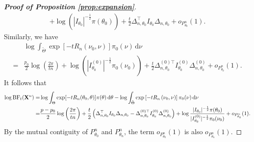 \documentclass[11pt]{article}
\theoremstyle{plain}
\theoremstyle{definition}
\theoremstyle{remark}
\begin{document}
\begin{appendices}
\begin{proof}[\textbf{Proof of Proposition \ref{prop:expansion}}]
$$\begin{aligned}
        +
        \log 
        \left( 
        |I_{\theta_0}|^{-\frac{1}{2}} \pi(\theta_0)
        \right)
     +
    \frac{t}{2}\Delta_{n,\theta_0}^\top  I_{\theta_0}\Delta_{n,\theta_0}
    +o_{P^n_{\theta_0}}(1).
\end{aligned}
$$
Similarly, we have
\begin{equation*}
\begin{split}
    &\log \int_{\tilde \Theta}
    \exp\left[-t R_n\left(\nu_0, \nu \right)\right] \pi_0(\nu)
\, \mathrm d \nu
\\
    =&
\frac{p_0}{2}\log\left(\frac{2\pi}{tn}\right) + \log \left( |I_{\theta_0}^{(0)}|^{-\frac{1}{2}} \pi_0(\nu_0)\right)
             +
             \frac{t}{2}\Delta_{n,\theta_0}^{{(0)}\top} I^{(0)}_{\theta_0}\Delta^{(0)}_{n,\theta_0}
            +o_{P^n_{\theta_0}}(1).
\end{split}
\end{equation*}
It follows that
\begin{align*}
    \log \text{BF}_t (\mathbf{X}^{n})
    =&
    \log
    \int_{\Theta}
\exp[-t R_n(\theta_0, \theta)] \pi(\theta)
\, \mathrm d \theta
-
    \log \int_{\tilde \Theta}
    \exp\left[-t R_n\left(\nu_0, \nu \right)\right] \pi_0(\nu)
\, \mathrm d \nu
    \\
    =&
   {\frac{p-p_0}{2}} \log \left( \frac{2\pi}{tn} \right)
+
        \frac t 2 \left( 
    \Delta_{n,\theta_0}^\top  I_{\theta_0}\Delta_{n,\theta_0}
            -
             \Delta_{n,\theta_0}^{{(0)}\top} I^{(0)}_{\theta_0}\Delta^{(0)}_{n,\theta_0}
        \right)
   +
   \log
       \frac{
   |I_{\theta_0}|^{-\frac 1 2}\pi(\theta_0) 
   }{
    |I_{\theta_0}^{(0)}|^{-\frac 1 2}\pi_0(\nu_0)
}
    +o_{P^n_{\theta_0}}(1)
    .
\end{align*}
By the mutual contiguity of $P_{\theta_0}^n$ and $P^n_{\theta_n}$, the term $o_{P^n_{\theta_0}}(1)$ is also $o_{P^n_{\theta_n}}(1)$. 
          
    \end{proof}


\end{appendices}
\end{document}
